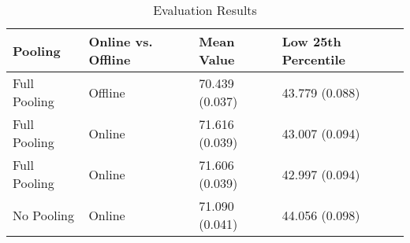 \begin{table}
\caption{Evaluation Results}
\label{tab:evaluation_results}
\begin{tabular}{llll}
\toprule
Pooling & Online vs. Offline & Mean Value & Low 25th Percentile \\
\midrule
Full Pooling & Offline & 70.439 (0.037) & 43.779 (0.088) \\
Full Pooling & Online & 71.616 (0.039) & 43.007 (0.094) \\
Full Pooling & Online & 71.606 (0.039) & 42.997 (0.094) \\
No Pooling & Online & 71.090 (0.041) & 44.056 (0.098) \\
\bottomrule
\end{tabular}
\end{table}
